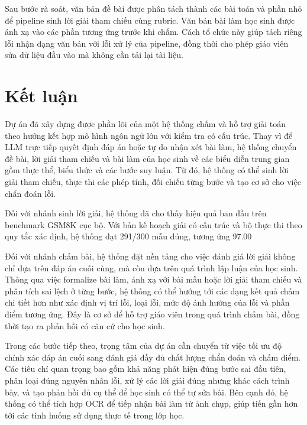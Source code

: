 \documentclass[12pt,a4paper]{article}
\begin{document}
Sau bước rà soát, văn bản đề bài được phân tách thành các bài toán và phần nhỏ để
pipeline sinh lời giải tham chiếu cùng rubric. Văn bản bài làm học sinh được ánh xạ
vào các phần tương ứng trước khi chấm. Cách tổ chức này giúp tách riêng lỗi nhận
dạng văn bản với lỗi xử lý của pipeline, đồng thời cho phép giáo viên sửa dữ liệu
đầu vào mà không cần tải lại tài liệu.



\section{Kết luận}

Dự án đã xây dựng được phần lõi của một hệ thống chấm và hỗ trợ giải toán theo hướng kết hợp mô hình ngôn ngữ lớn với kiểm tra có cấu trúc. Thay vì để LLM trực tiếp quyết định đáp án hoặc tự do nhận xét bài làm, hệ thống chuyển đề bài, lời giải tham chiếu và bài làm của học sinh về các biểu diễn trung gian gồm thực thể, biểu thức và các bước suy luận. Từ đó, hệ thống có thể sinh lời giải tham chiếu, thực thi các phép tính, đối chiếu từng bước và tạo cơ sở cho việc chẩn đoán lỗi.

Đối với nhánh sinh lời giải, hệ thống đã cho thấy hiệu quả ban đầu trên benchmark GSM8K cục bộ. Với bản kế hoạch giải có cấu trúc và bộ thực thi theo quy tắc xác định, hệ thống đạt 291/300 mẫu đúng, tương ứng 97.00%

Đối với nhánh chấm bài, hệ thống đặt nền tảng cho việc đánh giá lời giải không chỉ dựa trên đáp án cuối cùng, mà còn dựa trên quá trình lập luận của học sinh. Thông qua việc formalize bài làm, ánh xạ với bài mẫu hoặc lời giải tham chiếu và phân tích sai lệch ở từng bước, hệ thống có thể hướng tới các dạng kết quả chấm chi tiết hơn như xác định vị trí lỗi, loại lỗi, mức độ ảnh hưởng của lỗi và phần điểm tương ứng. Đây là cơ sở để hỗ trợ giáo viên trong quá trình chấm bài, đồng thời tạo ra phản hồi có căn cứ cho học sinh.

Trong các bước tiếp theo, trọng tâm của dự án cần chuyển từ việc tối ưu độ chính xác đáp án cuối sang đánh giá đầy đủ chất lượng chẩn đoán và chấm điểm. Các tiêu chí quan trọng bao gồm khả năng phát hiện đúng bước sai đầu tiên, phân loại đúng nguyên nhân lỗi, xử lý các lời giải đúng nhưng khác cách trình bày, và tạo phản hồi đủ cụ thể để học sinh có thể tự sửa bài. Bên cạnh đó, hệ thống có thể tích hợp OCR để tiếp nhận bài làm từ ảnh chụp, giúp tiến gần hơn tới các tình huống sử dụng thực tế trong lớp học.
\end{document}

